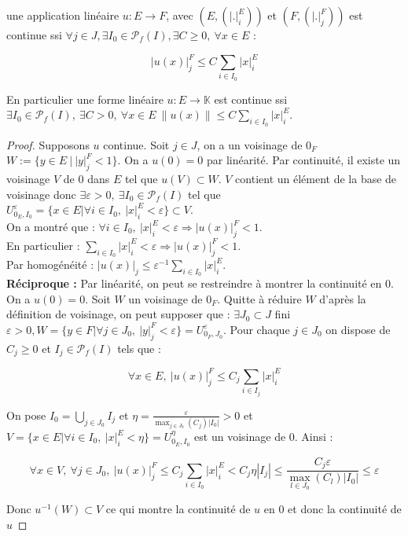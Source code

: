 \begin{proposition}
   une application linéaire $u:E\to F$, avec $(E, (|.|_i^E))$ et $(F,(|.|_j^F))$ est continue ssi $\forall j\in J, \exists I_0 \in \mathcal{P}_f(I), \exists C \geq  0,\ \forall x\in E$ : 
   
   $$ |u(x)|_j^F \le C \sum\limits_{i\in I_0} |x|_i^E$$
\end{proposition}

En particulier une forme linéaire $u:E\to \mathbb{K} $ est continue ssi $\exists I_0 \in \mathcal{P}_f(I),\ \exists C > 0,\ \forall x\in E\ \|u(x)\|\le C \sum\limits_{i\in I_0} |x|_i^E$.

\begin{proof}
   Supposons $u$ continue. Soit $j\in J$, on a un voisinage de $0_F$ \\$W:=\{y\in E\ |\ |y|_j^F<1\} $. 
   On a $u(0)=0$ par linéarité. Par continuité, il existe un voisinage $V$ de 0 dans $E$ tel que $u(V)\subset W$.
   $V$ contient un élément de la base de voisinage donc $\exists \varepsilon >0,\ \exists I_0 \in \mathcal{P}_f(I)$ tel que $U_{0_E,I_0}^\varepsilon = \{x\in E|\forall i\in I_0,\ |x|_i^E<\varepsilon  \} \subset V$.\\
   On a montré que : $\forall i\in I_0,\ |x|_i^E <\varepsilon \Rightarrow |u(x)|_j^F<1$. \\
   En particulier : $\sum\limits_{i\in I_0} |x|_i^E<\varepsilon \Rightarrow |u(x)|_j^F < 1 $.\\
   Par homogénéité : $|u(x)|_j \le \varepsilon ^{-1} \sum\limits_{i\in I_0} |x|_i^E$.\\
   
   \textbf{Réciproque :} Par linéarité, on peut se restreindre à montrer la continuité en $0$.\\
   On a $u(0)=0$. Soit $W$ un voisinage de $0_F$. Quitte à réduire $W$ d'après la définition de voisinage, on peut supposer que : $\exists J_0\subset J$ fini $\varepsilon >0, W=\{y\in F|\forall j\in J_0,\ |y|_j^F<\varepsilon  \} = U_{0_F,J_0}^\varepsilon$. Pour chaque $j\in J_0$ on dispose de $C_j \geq 0$ et $I_j \in \mathcal{P}_f(I)$ tels que :  
   
   $$\forall x \in E, ~ |u(x)|_j^F\le C_j \sum_{i\in I_j} |x|_i^E$$
   
   On pose $I_0=\bigcup_{j\in J_0}I_j$ et $\eta=\frac{\varepsilon}{\max_{j \in J_0} (C_j) |I_0|}>0$ et $V=\{x\in E|\forall i\in I_0,\ |x|_i^E<\eta \}=U_{0_E,I_0}^\eta$ est un voisinage de 0. Ainsi :
   
   $$\forall x\in V,\ \forall j\in J_0,\ |u(x)|_j^F\le C_j \sum\limits_{i\in I_0} |x|_i^E<C_j\eta|I_j|\le \frac{C_j \varepsilon}{\max_{l \in J_0} (C_l) |I_0|} \le \varepsilon $$

   Donc $u^{-1}(W) \subset V$ ce qui montre la continuité de $u$ en $0$ et donc la continuité de $u$
\end{proof}

